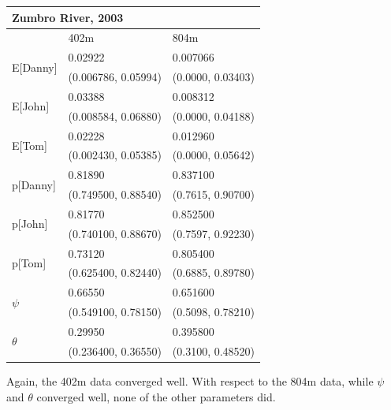 \documentclass[12pt]{article}
\begin{document}
    \begin{center}
    \begin{tabular}{|l|l|l|}
        \hline
        \multicolumn{3}{|l|}{\textbf{Zumbro River, 2003}} \\
        \hline
            & 402m & 804m \\
        \hline
        \multirow{2}{*}{E[Danny]}
            & 0.02922 & 0.007066 \\
            & (0.006786, 0.05994) & (0.0000, 0.03403) \\
        \hline
        \multirow{2}{*}{E[John]}
            & 0.03388 & 0.008312 \\
            & (0.008584, 0.06880) & (0.0000, 0.04188) \\
        \hline
        \multirow{2}{*}{E[Tom]}
            & 0.02228 & 0.012960 \\
            & (0.002430, 0.05385) & (0.0000, 0.05642) \\
        \hline
        \multirow{2}{*}{p[Danny]}
            & 0.81890 & 0.837100 \\
            & (0.749500, 0.88540) & (0.7615, 0.90700) \\
        \hline
        \multirow{2}{*}{p[John]}
            & 0.81770 & 0.852500 \\
            & (0.740100, 0.88670) & (0.7597, 0.92230) \\
        \hline
        \multirow{2}{*}{p[Tom]}
            & 0.73120 & 0.805400 \\
            & (0.625400, 0.82440) & (0.6885, 0.89780) \\
        \hline
        \multirow{2}{*}{\(\psi\)}
            & 0.66550 & 0.651600 \\
            & (0.549100, 0.78150) & (0.5098, 0.78210) \\
        \hline
        \multirow{2}{*}{\(\theta\)}
            & 0.29950 & 0.395800 \\
            & (0.236400, 0.36550) & (0.3100, 0.48520) \\
        \hline
    \end{tabular}
    \end{center}

    Again, the 402m data converged well. With respect to the 804m data, while
    \(\psi\) and \(\theta\) converged well, none of the other parameters did.
\end{document}
